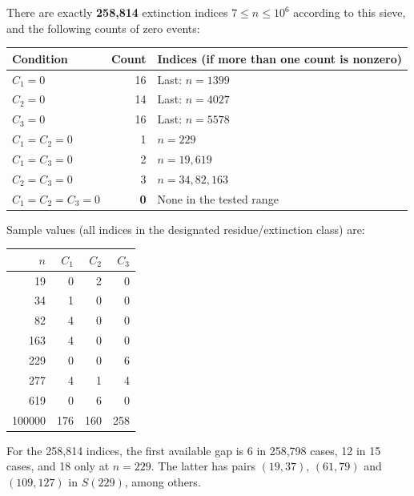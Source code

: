 \documentclass[11pt,a4paper]{article}
\theoremstyle{definition}
\begin{document}
There are exactly \textbf{258,814} extinction indices $7\le n\le10^6$ according to this sieve, and the following counts of zero events:
\begin{center}
\begin{tabular}{@{}l r l@{}}
\toprule
Condition & Count & Indices (if more than one count is nonzero)\\
\midrule
$C_1=0$ & 16 & Last: $n=1399$\\
$C_2=0$ & 14 & Last: $n=4027$\\
$C_3=0$ & 16 & Last: $n=5578$\\
$C_1=C_2=0$ & 1 & $n=229$\\
$C_1=C_3=0$ & 2 & $n=19,619$\\
$C_2=C_3=0$ & 3 & $n=34,82,163$\\
$C_1=C_2=C_3=0$ & \textbf{0} & None in the tested range\\
\bottomrule
\end{tabular}
\end{center}
Sample values (all indices in the designated residue/extinction class) are:
\begin{center}
\begin{tabular}{@{}r r r r@{}}
\toprule
$n$ & $C_1$ & $C_2$ & $C_3$\\
\midrule
19&0&2&0\\
34&1&0&0\\
82&4&0&0\\
163&4&0&0\\
229&0&0&6\\
277&4&1&4\\
619&0&6&0\\
100000&176&160&258\\
\bottomrule
\end{tabular}
\end{center}
For the 258,814 indices, the first available gap is 6 in 258,798 cases, 12 in 15 cases, and 18 only at $n=229$. The latter has pairs $(19,37)$, $(61,79)$ and $(109,127)$ in $S(229)$, among others.
\end{document}
